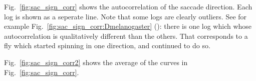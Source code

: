 
Fig.~\ref{fig:sac_sign_corr} shows the autocorrelation of the saccade direction. Each log is shown as a seperate line. Note that some logs are clearly outliers. See for example Fig.~\ref{fig:sac_sign_corr:Dmelanogaster} (\Dmelanogaster): there is one log which whose autocorrelation is qualitatively different than the others. That corresponds to a fly which started spinning in one direction, and continued to do so. 

Fig.~\ref{fig:sac_sign_corr2} shows the average of the curves in Fig.~\ref{fig:sac_sign_corr}.
